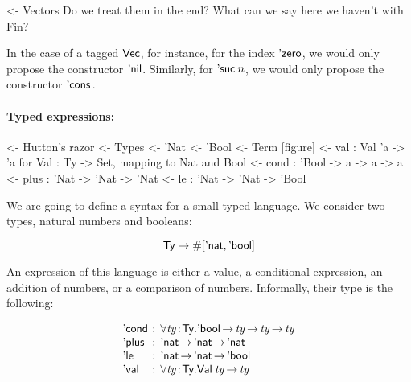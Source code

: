 \begin{wstructure}
<- Vectors
    Do we treat them in the end? 
    What can we say here we haven't with Fin?
\end{wstructure}

In the case of a tagged $\D{Vec}$, for instance, for the index
$\NatZero$, we would only propose the constructor
$\ListNil$. Similarly, for $\NatSuc{n}$, we would only propose the
constructor $\ListCons{\!}{\!}$.
 
\paragraph{Typed expressions:}

\begin{wstructure}
<- Hutton's razor
    <- Types
        <- 'Nat
        <- 'Bool
    <- Term [figure]
        <- val : Val 'a -> 'a  for Val : Ty -> Set, mapping to Nat and Bool
        <- cond : 'Bool -> a -> a -> a
        <- plus : 'Nat -> 'Nat -> 'Nat
        <- le : 'Nat -> 'Nat -> 'Bool
\end{wstructure}

\newcommand{\Ty}{\C{Ty}}
\newcommand{\Ebool}{\etag{\CN{bool}}}
\newcommand{\Enat}{\etag{\CN{nat}}}

\newcommand{\Eval}[1]{\etag{\CN{val}}\:#1}
\newcommand{\Econd}[3]{\etag{\CN{cond}}\:#1\:#2\:#3}
\newcommand{\Eplus}[2]{\etag{\CN{plus}}\:#1\:#2}
\newcommand{\Ele}[2]{\etag{\CN{le}}\:#1\:#2}

\newcommand{\Val}[1]{\F{Val}\:#1}
\newcommand{\Var}[2]{\F{Var}_{#1} #2}

\newcommand{\HExprD}{\C{ExprD}}
\newcommand{\HExprAD}{\C{ExprAD}}
\newcommand{\HExprID}{\C{ExprID}}
\newcommand{\HExprVarD}[1]{\C{ExprD}_{\F{Var},#1}}
\newcommand{\HExprFreeD}{\C{ExprD}^{\C{Free}}}
\newcommand{\HExprAFreeD}{\C{ExprAD}^{\C{Free}}}

We are going to define a syntax for a small typed language. We
consider two types, natural numbers and booleans:

\[
\Ty \mapsto \EnumT{[\Enat, \Ebool]}
\]

An expression of this language is either a value, a conditional
expression, an addition of numbers, or a comparison of
numbers. Informally, their type is the following:

\[
\begin{array}{l@{\::\:\:}l}
\Econd{\!}{\!}{\!}   & \forall \Bhab{\V{ty}}{\Ty} . \Ebool \To \V{ty} \To \V{ty} \To \V{ty}  \\ 
\Eplus{\!}{\!}       & \Enat \To \Enat \To \Enat                           \\
\Ele{\!}{\!}         & \Enat \To \Enat \To \Ebool                          \\
\Eval{\!}            & \forall \Bhab{\V{ty}}{\Ty} . \Val{\V{ty}} \To \V{ty}
\end{array}
\]

